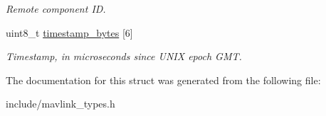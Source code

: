 \begin{DoxyCompactItemize}
\begin{DoxyCompactList}\small\item\em Remote component ID. \end{DoxyCompactList}\item 
uint8\+\_\+t \hyperlink{struct____mavlink__signing__streams_1_1____mavlink__signing__stream_ab37a9545845dc8787643f561083abac0}{timestamp\+\_\+bytes} \mbox{[}6\mbox{]}\hypertarget{struct____mavlink__signing__streams_1_1____mavlink__signing__stream_ab37a9545845dc8787643f561083abac0}{}\label{struct____mavlink__signing__streams_1_1____mavlink__signing__stream_ab37a9545845dc8787643f561083abac0}

\begin{DoxyCompactList}\small\item\em Timestamp, in microseconds since U\+N\+IX epoch G\+MT. \end{DoxyCompactList}\end{DoxyCompactItemize}


The documentation for this struct was generated from the following file\+:\begin{DoxyCompactItemize}
\item 
include/mavlink\+\_\+types.\+h\end{DoxyCompactItemize}
